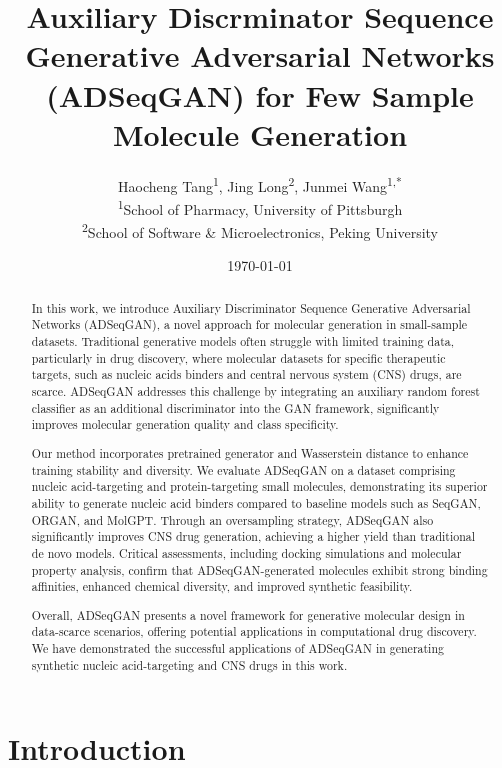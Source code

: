 \documentclass[10pt, twocolumn]{article}
\title{\textbf{Auxiliary Discrminator Sequence Generative Adversarial Networks (ADSeqGAN) for Few Sample Molecule Generation}}
\author{
    Haocheng Tang\textsuperscript{1}, Jing Long\textsuperscript{2}, Junmei Wang\textsuperscript{1,*} \\
    \textsuperscript{1}School of Pharmacy, University of Pittsburgh \\
    \textsuperscript{2}School of Software \& Microelectronics, Peking University
}
\date{\today} %
\begin{document}
\maketitle

\begin{abstract}
In this work, we introduce Auxiliary Discriminator Sequence Generative Adversarial Networks (ADSeqGAN), a novel approach for molecular generation in small-sample datasets. Traditional generative models often struggle with limited training data, particularly in drug discovery, where molecular datasets for specific therapeutic targets, such as nucleic acids binders and central nervous system (CNS) drugs, are scarce. ADSeqGAN addresses this challenge by integrating an auxiliary random forest classifier as an additional discriminator into the GAN framework, significantly improves molecular generation quality and class specificity.

Our method incorporates pretrained generator and Wasserstein distance to enhance training stability and diversity. We evaluate ADSeqGAN on a dataset comprising nucleic acid-targeting and protein-targeting small molecules, demonstrating its superior ability to generate nucleic acid binders compared to baseline models such as SeqGAN, ORGAN, and MolGPT. Through an oversampling strategy, ADSeqGAN also significantly improves CNS drug generation, achieving a higher yield than traditional de novo models. Critical assessments, including docking simulations and molecular property analysis, confirm that ADSeqGAN-generated molecules exhibit strong binding affinities, enhanced chemical diversity, and improved synthetic feasibility.

Overall, ADSeqGAN presents a novel framework for generative molecular design in data-scarce scenarios, offering potential applications in computational drug discovery. We have demonstrated the successful applications of ADSeqGAN in generating synthetic nucleic acid-targeting and CNS drugs in this work.


\end{abstract}

\section{Introduction}
\end{document}
